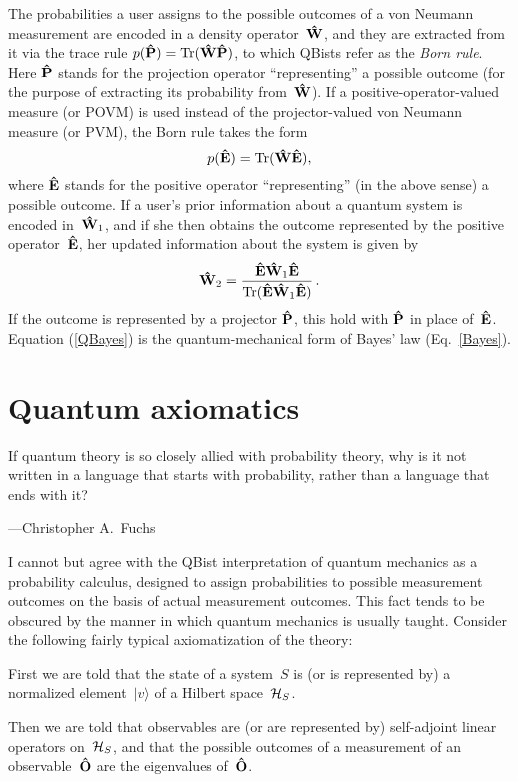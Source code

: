 \documentclass[smallextended]{svjour3}
\newcommand{\ket}[1]{|#1\rangle}
\newcommand{\be}{\begin{equation}}
\newcommand{\ee}{\end{equation}}
\newcommand{\hE}{{\bf\hat E}}
\newcommand{\hP}{{\bf\hat P}}
\newcommand{\hW}{{\bf\hat W}}
\newcommand{\hO}{{\bf\hat O}}
\newcommand{\cH}{{\cal H}}
\begin{document}
The probabilities a user assigns to the possible outcomes of a von Neumann measurement are encoded in a density operator~$\hW$, and they are extracted from it via the trace rule $p(\hP)=\hbox{Tr}(\hW\hP)$, to which QBists refer as the \emph{Born rule}. Here $\hP$ stands for the projection operator ``representing'' a possible outcome (for the purpose of extracting its probability from~$\hW$). If a positive-operator-valued measure (or POVM) is used instead of the projector-valued von Neumann measure (or PVM), the Born rule takes the form 
\be
p(\hE)=\hbox{Tr}(\hW\hE),
\ee
where $\hE$ stands for the positive operator ``representing'' (in the above sense) a possible outcome. If a user's prior information about a quantum system is encoded in~$\hW_1$, and if she then obtains the outcome represented by the positive operator~$\hE$, her updated information about the system is given by
\be
	\hW_2=\frac{\hE\hW_1\hE}{\hbox{Tr}(\hE\hW_1\hE)}\,.
\label{QBayes}
\ee
If the outcome is represented by a projector $\hP$, this hold with $\hP$ in place of~$\hE$. Equation (\ref{QBayes}) is the quantum-mechanical form of Bayes' law (Eq.~\ref{Bayes}).


\section{Quantum axiomatics}\label{sec.qa}
{\leftskip\parindent\small If quantum theory is so closely allied with probability theory, why is it not written in a language that starts with probability, rather than a language that ends with it?\par\hfill---Christopher A.\ Fuchs\cite{Fuchs_Perimeter}\par}\medskip

\noindent I cannot but agree with the QBist interpretation of quantum mechanics as a probability calculus, designed to assign probabilities to possible measurement outcomes on the basis of actual measurement outcomes. This fact tends to be obscured by the manner in which quantum mechanics is usually taught. Consider the following fairly typical axiomatization of the theory:

First we are told that the state of a system~$S$ is (or is represented by) a normalized element~$\ket v$ of a Hilbert space~$\cH_S$.

Then we are told that observables are (or are represented by) self-adjoint linear operators on~$\cH_S$, and that the possible outcomes of a measurement of an observable~$\hO$ are the eigenvalues of~$\hO$.
\end{document}
